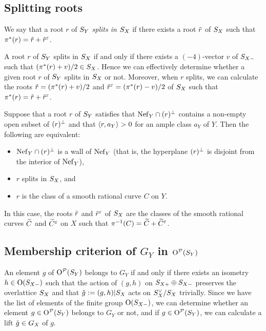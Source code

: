 \documentclass{amsart}
\numberwithin{procedure}{section}
\begin{document}
\subsection{Splitting roots}\label{subsec:splitting}
%
\begin{definition}
We say that a root $r$ of $S_{Y}$ \emph{splits in $S_{X}$}
if there exists a root  $\tilde{r}$ of $S_{X}$ such that $\pi^*(r)=\tilde{r}+\tilde{r}^\varepsilon$.
 \end{definition}
%
A root $r$ of $S_{Y}$ splits in $S_{X}$ if and only if 
there exists a $(-4)$-vector $v$ of $S_{X-}$ such that $(\pi^*(r)+v)/2\in S_{X}$.
Hence we can effectively determine whether a given root $r$ of $S_{Y}$ splits in $S_{X}$ or not.
Moreover, when $r$ splits,
we can calculate the  roots  $\tilde{r}=(\pi^*(r)+v)/2$ and $\tilde{r}^\varepsilon=(\pi^*(r)-v)/2$ of $S_{X}$
such that $\pi^*(r)=\tilde{r}+\tilde{r}^\varepsilon$.
\par
Suppose that  a  root $r$ of $S_{Y}$  satisfies that 
$\mathord{\rm Nef}_{Y}\cap (r)\sp{\perp} $ contains a non-empty open subset of $(r)\sp{\perp} $
and that $\langle r, a_Y \rangle>0$ for an ample class $a_Y$ of $Y$.
Then the following are equivalent:
%
\begin{itemize} 
\item $\mathord{\rm Nef}_{Y}\cap (r)\sp{\perp} $ is a wall of $\mathord{\rm Nef}_{Y}$ 
(that is, the hyperplane $(r)\sp{\perp}$ is disjoint from  the interior of $\mathord{\rm Nef}_{Y}$),
\item $r$ splits in $S_{X}$, and 
\item $r$ is the class of a smooth rational curve $C$ on $Y$.
\end{itemize}
%
In this case, 
the  roots  $\tilde{r}$ and $\tilde{r}^\varepsilon$ of $S_{X}$ 
are the classes of  the smooth rational curves 
 $\widetilde{C}$ and $\widetilde{C}^\varepsilon$ on $X$ such that $\pi\sp{-1}(C)=\widetilde{C}+\widetilde{C}^\varepsilon$.
%
\subsection{Membership criterion of $G_Y$ in  $ \mathord{\mathrm{O}}^{\mathord{\mathcal P}}(S_{Y})$}\label{subsec:Membership1}
%
An element $g$ of $ \mathord{\mathrm{O}}^{\mathord{\mathcal P}}(S_{Y})$ belongs to $G_Y$
if and only if 
there exists an isometry $h\in \mathord{\mathrm{O}}(S_{X-})$ such that the action of 
$(g, h)$ on $S_{X+}\oplus S_{X-}$ preserves 
the overlattice $S_{X}$ and that $\tilde{g}:=(g, h)|S_{X}$ 
acts on  $S_{X}\sp{\vee}/S_{X}$ trivially.
Since we have the list of elements of the finite group $\mathord{\mathrm{O}}(S_{X-})$,
we can determine whether an element $g\in \mathord{\mathrm{O}}^{\mathord{\mathcal P}}(S_{Y})$
belongs to $G_Y$ or not,
and if  $g\in \mathord{\mathrm{O}}^{\mathord{\mathcal P}}(S_{Y})$,
we can calculate a  lift $\tilde{g}\in G_X$ of $g$.
%
%
\end{document}
